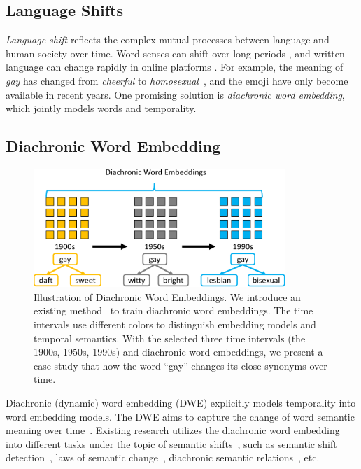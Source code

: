\subsection{Language Shifts}

\textit{Language shift} reflects the complex mutual processes between language and human society over time.
Word senses can shift over long periods \cite{hamilton2016diachronic}, and written language can change rapidly in online platforms \cite{eisenstein2014diffusion, goel2016social}.
For example, the meaning of \textit{gay} has changed from \textit{cheerful} to \textit{homosexual}~\cite{hamilton2016diachronic}, and the emoji have only become available in recent years. 
One promising solution is \textit{diachronic word embedding}, which jointly models words and temporality.


\subsection{Diachronic Word Embedding}
\label{chap2:sec:dwe}

\begin{figure}[tb!]
\centering
\includegraphics[width=0.85\textwidth]{images/chapter2/diachronic.pdf}
\caption{Illustration of Diachronic Word Embeddings. We introduce an existing method~\cite{kulkarni2015statistically} to train diachronic word embeddings. The time intervals use different colors to distinguish embedding models and temporal semantics. With the selected three time intervals (the 1900s, 1950s, 1990s) and diachronic word embeddings, we present a case study that how the word ``gay'' changes its close synonyms over time.}
\label{chap2:fig:diachronic}
\end{figure}

Diachronic (dynamic) word embedding (DWE) explicitly models temporality into word embedding models.
The DWE aims to capture the change of word semantic meaning over time~\cite{kutuzov2018diachronic}.
Existing research utilizes the diachronic word embedding into different tasks under the topic of semantic shifts~\cite{kutuzov2018diachronic}, such as semantic shift detection~\cite{mihalcea2012word, kim2014temporal, kulkarni2015statistically, rudolph2018dynamic, yao2018dynamic, rosenfeld2018deep}, laws of semantic change~\cite{hamilton2016diachronic, dubossarsky2017outta}, diachronic semantic relations~\cite{rosin2017learning, szymanski2017temporal}, etc.

